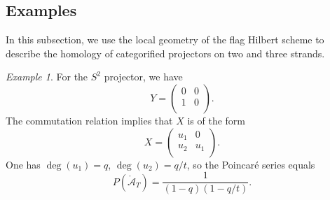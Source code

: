 \documentclass[12pt]{amsart}
\numberwithin{equation}{section}
\theoremstyle{definition}
\theoremstyle{remark}
\newtheorem{example}[theorem]{Example}
\newcommand{\CC}{\mathbb{C}}
\newcommand{\CA}{\mathcal{A}}
\renewcommand{\1}{\mathbf{1}}
\newcommand{\FH}{\mathrm{FHilb}}
\newcommand{\oFH}{\mathring{\FH}}
\newcommand{\torus}{\CC^{*} \times \CC^*}
\newcommand{\oCA}{\mathring{\CA}}
\begin{document}


\subsection{Examples }
\label{sec:exprojectors}

In this subsection, we use the local geometry of the flag Hilbert scheme to describe the homology of 
categorified projectors on two and three strands.

\begin{example}
For the $S^2$ projector, we have
$$
Y=\left(\begin{matrix}
0 & 0\\
1 & 0\\
\end{matrix}\right).
$$
The commutation relation implies that \(X\) is of the form
$$
X=\left(\begin{matrix}
u_1 & 0\\
u_2 & u_1\\
\end{matrix}\right).
$$
One has $\deg(u_1)=q$, $\deg(u_2)=q/t$, so the Poincar\'e series equals 
$$
P(\oCA_T)=\frac{1}{(1-q)(1-q/t)}.
$$
\end{example}
\end{document}
